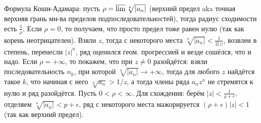 \section{} %
Формула Коши-Адамара: пусть $\rho=\varlimsup\sqrt[n]{|a_n|}$ (верхний предел aka точная верхняя грань мн-ва пределов подпоследовательностей), тогда радиус сходимости есть $\frac1\rho$.
Если $\rho=0$, то получаем, что просто предел тоже равен нулю (так как корень неотрицателен).
Взяли $z$, тогда с некоторого места $\sqrt[n]{|a_n|} < \frac{1}{2|z|}$, возвлеи в степень, перенесли $|z|^n$, ряд оценился геом. прогрессией и везде сошёлся, что и надо.
Если $\rho=+\infty$, то покажем, что при $z \neq 0$ разойдётся: взяли последовательность $n_k$, при которой $\sqrt[n]{|a_n|} \to +\infty$, тогда для любого
$z$ найдётся такое $k$, что начиная с него $\sqrt[n]{a_n} > 1/z$, а тогда члены ряда $a_nz^n$ не стремятся к нулю и ряд разойдётся.
Пусть $0<\rho < \infty$.
Для схождения: берём $|z|<\frac{1}{\rho+\epsilon}$, отделяем $\sqrt[n]{|a_n|}<p+\epsilon$, ряд с некоторого места мажорируется $(\rho + \epsilon)|z|<1$ (так как верхний предел).
